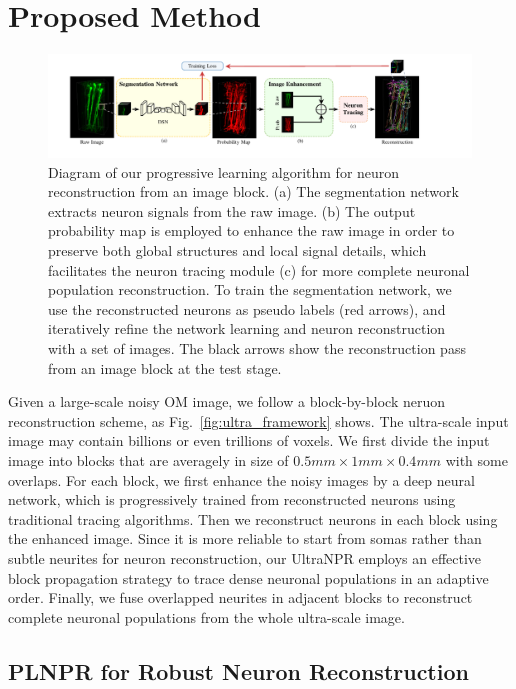 \section{Proposed Method}
\label{sec:method}
\begin{figure}[th]
	\centering
	\includegraphics[width=1\textwidth]{./Illustrations/framework_plnpr.pdf}
	\caption{Diagram of our progressive learning algorithm for neuron reconstruction from an image block. (a) The segmentation network extracts neuron signals from the raw image. (b) The output probability map is employed to enhance the raw image in order to preserve both global structures and local signal details, which facilitates the neuron tracing module (c) for more complete neuronal population reconstruction. To train the segmentation network, we use the reconstructed neurons as pseudo labels (red arrows), and iteratively refine the network learning and neuron reconstruction with a set of images. The black arrows show the reconstruction pass from an image block at the test stage.}
	\label{fig:framework}
\end{figure}


Given a large-scale noisy OM image, we follow a block-by-block neruon reconstruction scheme, as Fig.~\ref{fig:ultra_framework} shows. 
%
The ultra-scale input image may contain billions or even trillions of voxels.
We first divide the input image into blocks that are averagely in size of $0.5mm\times 1mm\times 0.4mm$ with some overlaps. 
%
For each block, we first enhance the noisy images by a deep neural network, which is progressively trained from reconstructed neurons using traditional tracing algorithms. 
Then we reconstruct neurons in each block using the enhanced image. 
%
Since it is more reliable to start from somas rather than subtle neurites for neuron reconstruction, our UltraNPR employs an effective block propagation strategy to trace dense neuronal populations in an adaptive order. 
Finally, we fuse overlapped neurites in adjacent blocks to reconstruct complete neuronal populations from the whole ultra-scale image.


\subsection{PLNPR for Robust Neuron Reconstruction}
\label{sec:PLNPR}


